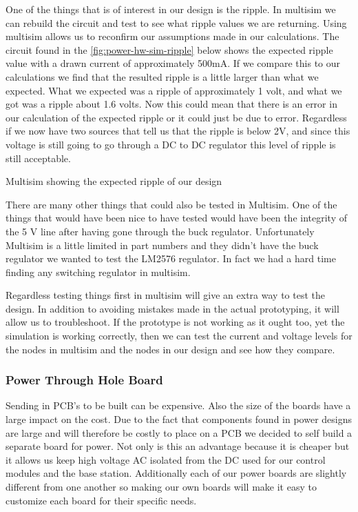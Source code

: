 One of the things that is of interest in our design is the ripple. In multisim
we can rebuild the circuit and test to see what ripple values we are returning.
Using multisim allows us to reconfirm our assumptions made in our calculations.
The circuit found in the \autoref{fig:power-hw-sim-ripple} below shows the expected ripple
value with a drawn current of approximately 500mA. If we compare this to our
calculations we find that the resulted ripple is a little larger than what we
expected. What we expected was a ripple of approximately 1 volt, and what we
got was a ripple about 1.6 volts.  Now this could mean that there is an error
in our calculation of the expected ripple or it could just be due to error.
Regardless if we now have two sources that tell us that the ripple is below 2V,
and since this voltage is still going to go through a DC to DC regulator this
level of ripple is still acceptable.

{Multisim showing the expected ripple of our design}

There are many other things that could also be tested in Multisim. One of the
things that would have been nice to have tested would have been the integrity
of the 5 V line after having gone through the buck regulator. Unfortunately
Multisim is a little limited in part numbers and they didn{}'t have the buck
regulator we wanted to test the LM2576 regulator. In fact we had a hard time
finding any switching regulator in multisim.

Regardless testing things first in multisim will give an extra way to test the
design. In addition to avoiding mistakes made in the actual prototyping, it
will allow us to troubleshoot. If the prototype is not working as it ought too,
yet the simulation is working correctly, then we can test the current and
voltage levels for the nodes in multisim and the nodes in our design and see
how they compare.

\subsubsection{Power Through Hole Board}
\label{sec:power-through}
Sending in PCB{}'s to be built can be expensive. Also the size of the boards
have a large impact on the cost. Due to the fact that components found in power
designs are large and will therefore be costly to place on a PCB we decided to
self build a separate board for power. Not only is this an advantage because it
is cheaper but it allows us keep high voltage AC isolated from the DC used for
our control modules and the base station. Additionally each of our power boards
are slightly different from one another so making our own boards will make it
easy to customize each board for their specific needs.

